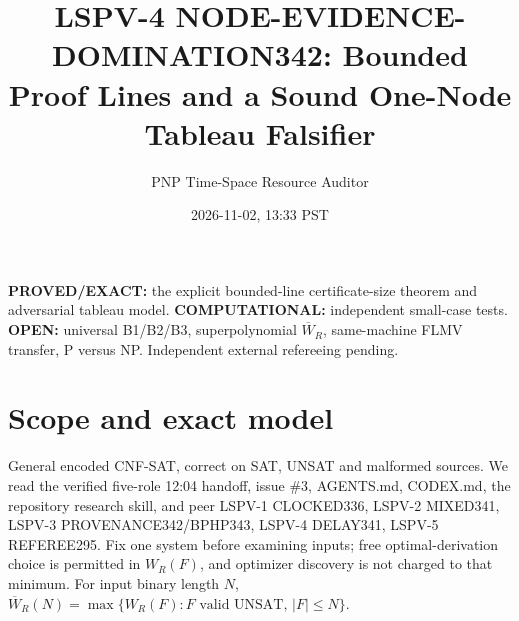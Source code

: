 \documentclass[11pt]{article}
\title{LSPV-4 NODE-EVIDENCE-DOMINATION342: Bounded Proof Lines and a Sound One-Node Tableau Falsifier}
\author{PNP Time-Space Resource Auditor}
\date{2026-11-02, 13:33 PST}
\begin{document}
\maketitle
\noindent\textbf{PROVED/EXACT:} the explicit bounded-line certificate-size theorem and adversarial tableau model. \textbf{COMPUTATIONAL:} independent small-case tests. \textbf{OPEN:} universal B1/B2/B3, superpolynomial $\overline W_R$, same-machine FLMV transfer, P versus NP. Independent external refereeing pending.
\section*{Scope and exact model}
General encoded CNF-SAT, correct on SAT, UNSAT and malformed sources. We read the verified five-role 12:04 handoff, issue \#3, AGENTS.md, CODEX.md, the repository research skill, and peer LSPV-1 CLOCKED336, LSPV-2 MIXED341, LSPV-3 PROVENANCE342/BPHP343, LSPV-4 DELAY341, LSPV-5 REFEREE295. Fix one system before examining inputs; free optimal-derivation choice is permitted in $W_R(F)$, and optimizer discovery is not charged to that minimum. For input binary length $N$, $\overline W_R(N)=\max\{W_R(F):F\text{ valid UNSAT},\,|F|\le N\}$.
\end{document}
